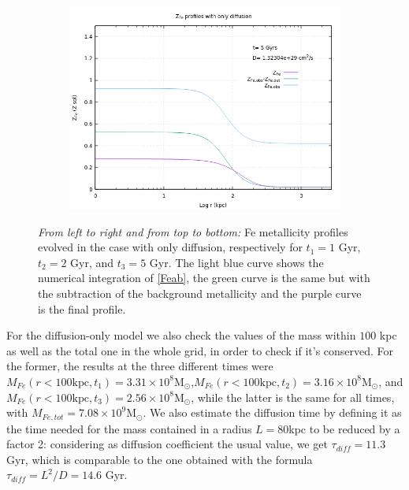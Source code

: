 \documentclass{article}
\begin{document}
\begin{figure} [H]
\begin{subfigure}{0.49\textwidth}
	\end{subfigure}
	\begin{subfigure}{0.49\textwidth}
		\includegraphics[width=0.9\linewidth]{Z_diff_5.png}
	\end{subfigure}
	\caption{\textit{From left to right and from top to bottom:} Fe metallicity profiles evolved in the case with only diffusion, respectively for $t_{1}=1 $ Gyr, $t_{2}=2$ Gyr, and $t_{3}=5$ Gyr. The light blue curve shows the numerical integration of \eqref{Feab}, the green curve is the same but with the subtraction of the background metallicity and the purple curve is the final profile.}
	\label{fig:Zdiffonly}
\end{figure}
For the diffusion-only model we also check the values of the mass within $100$ kpc as well as the total one in the whole grid, in order to check if it's conserved. For the former, the results at the three different times were $M_{Fe}(r<100\text{kpc},t_{1})=3.31\times10^{8}$M$_{\odot}$,$M_{Fe}(r<100\text{kpc},t_{2})=3.16\times10^{8}$M$_{\odot}$,
 and $M_{Fe}(r<100\text{kpc},t_{3})=2.56\times10^{8}$M$_{\odot}$, while the latter is the same for all times, with $M_{Fe,tot}=7.08\times10^{9}$M$_{\odot}$. 
 We also estimate the diffusion time by defining it as the time needed for the mass contained in a radius $L=80$kpc to be reduced by a factor 2: considering as diffusion coefficient the usual value, we get $\tau_{diff}=11.3$Gyr, which is comparable to the one obtained with the formula $\tau_{diff}=L^{2}/D=14.6$ Gyr. 
\end{document}
